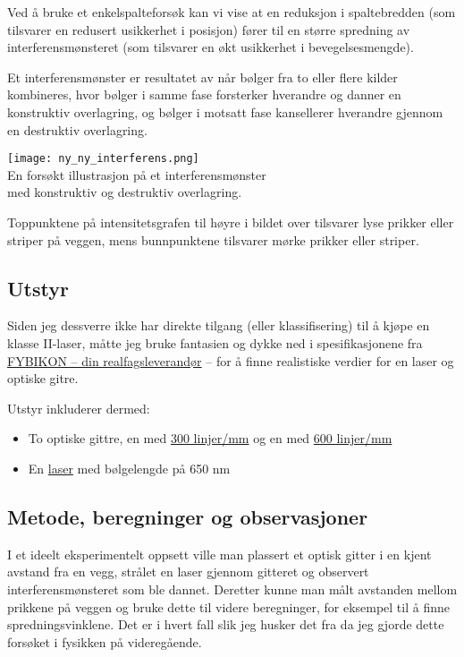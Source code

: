 \documentclass{article}
\begin{document}
Ved å bruke et enkelspalteforsøk kan vi vise at en reduksjon i spaltebredden (som tilsvarer en redusert usikkerhet i posisjon) fører til en større spredning av interferensmønsteret (som tilsvarer en økt usikkerhet i bevegelsesmengde). 

Et interferensmønster er resultatet av når bølger fra to eller flere kilder kombineres, hvor bølger i samme fase forsterker hverandre og danner en konstruktiv overlagring, og bølger i motsatt fase kansellerer hverandre gjennom en destruktiv overlagring. 

\begin{center}
    \texttt{[image: ny\_ny\_interferens.png]}\\
    \caption{\label{fig:Interferens} En forsøkt illustrasjon på et interferensmønster \\med konstruktiv og destruktiv overlagring.}
\end{center}
Toppunktene på intensitetsgrafen til høyre i bildet over tilsvarer lyse prikker eller striper på veggen, mens bunnpunktene tilsvarer mørke prikker eller striper.


\vspace{0.2in}
\subsection{Utstyr}
Siden jeg dessverre ikke har direkte tilgang (eller klassifisering) til å kjøpe en klasse II-laser, måtte jeg bruke fantasien og dykke ned i spesifikasjonene fra \href{https://www.fybikon.no/om-oss}{FYBIKON – din realfagsleverandør} – for å finne realistiske verdier for en laser og optiske gitre.


\vspace{0.1in}
Utstyr inkluderer dermed:
\begin{itemize}
\item To optiske gittre, en med \href{https://www.fybikon.no/fysikk/optikk/diffraksjon/optisk-gitter-300-linjer/mm}{300 linjer/mm} og en med \href{https://www.fybikon.no/fysikk/optikk/diffraksjon/optisk-gitter-600-linjer/mm}{600 linjer/mm}
\item En \href{https://www.fybikon.no/fysikk/optikk/laser/laserpenn-rod-klasse-ii-650-mm-1-mw}{laser} med bølgelengde på 650 nm
\end{itemize}
\vspace{0.2in}

\subsection{Metode, beregninger og observasjoner}
I et ideelt eksperimentelt oppsett ville man plassert et optisk gitter i en kjent avstand fra en vegg, strålet en laser gjennom gitteret og observert interferensmønsteret som ble dannet. Deretter kunne man målt avstanden mellom prikkene på veggen og bruke dette til videre beregninger, for eksempel til å finne spredningsvinklene. Det er i hvert fall slik jeg husker det fra da jeg gjorde dette forsøket i fysikken på videregående.
\end{document}
